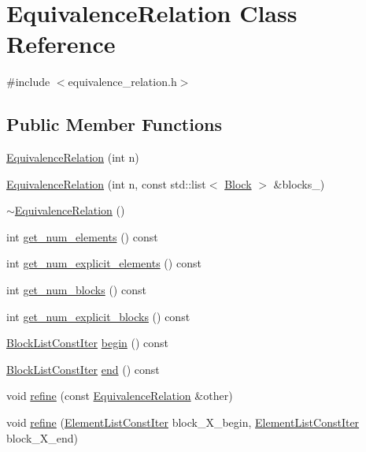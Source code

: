 \hypertarget{classEquivalenceRelation}{\section{Equivalence\-Relation Class Reference}
\label{classEquivalenceRelation}
}


{\ttfamily \#include $<$equivalence\-\_\-relation.\-h$>$}

\subsection*{Public Member Functions}
\begin{DoxyCompactItemize}
\item 
\hyperlink{classEquivalenceRelation_a45bcace3a45f83e087b5bfd008be7a59}{Equivalence\-Relation} (int n)
\item 
\hyperlink{classEquivalenceRelation_a93e9f1d3c5298ff40895c066565b483d}{Equivalence\-Relation} (int n, const std\-::list$<$ \hyperlink{classBlock}{Block} $>$ \&blocks\-\_\-)
\item 
\hyperlink{classEquivalenceRelation_aaab14b8174df20658035397a1a672462}{$\sim$\-Equivalence\-Relation} ()
\item 
int \hyperlink{classEquivalenceRelation_a4b44f31d6d19280b6fe6f192d649572e}{get\-\_\-num\-\_\-elements} () const 
\item 
int \hyperlink{classEquivalenceRelation_af2437c19b12e284d7703bb28ff6fcc89}{get\-\_\-num\-\_\-explicit\-\_\-elements} () const 
\item 
int \hyperlink{classEquivalenceRelation_a29c0989de637b4b6ba8ca585fe94e3a4}{get\-\_\-num\-\_\-blocks} () const 
\item 
int \hyperlink{classEquivalenceRelation_aa189e7e375b1211d3445f5b2f268c832}{get\-\_\-num\-\_\-explicit\-\_\-blocks} () const 
\item 
\hyperlink{equivalence__relation_8h_a12e817b65a28b802e85b48c8b600c4a5}{Block\-List\-Const\-Iter} \hyperlink{classEquivalenceRelation_a3da008a451c9d93b6f1263a6c1fcfa76}{begin} () const 
\item 
\hyperlink{equivalence__relation_8h_a12e817b65a28b802e85b48c8b600c4a5}{Block\-List\-Const\-Iter} \hyperlink{classEquivalenceRelation_a933dfe467eb51a2d1bdeb7171910ac06}{end} () const 
\item 
void \hyperlink{classEquivalenceRelation_a998178b75f14d38f2566be8de124ef70}{refine} (const \hyperlink{classEquivalenceRelation}{Equivalence\-Relation} \&other)
\item 
void \hyperlink{classEquivalenceRelation_ad04cdc09efd376f65e984fd39780c59c}{refine} (\hyperlink{equivalence__relation_8h_adcd1a68c6846e41421e3868fd40bdd81}{Element\-List\-Const\-Iter} block\-\_\-\-X\-\_\-begin, \hyperlink{equivalence__relation_8h_adcd1a68c6846e41421e3868fd40bdd81}{Element\-List\-Const\-Iter} block\-\_\-\-X\-\_\-end)
\end{DoxyCompactItemize}
